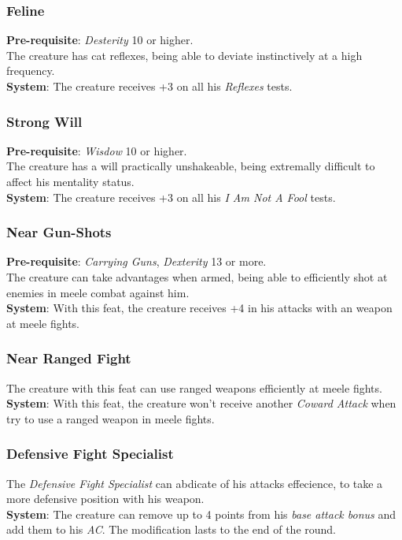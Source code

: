 \documentclass[ letterpaper,12pt]{article}
\begin{document}
\subsubsection{Feline}
{\bf Pre-requisite}: {\it Desterity} 10 or higher.\\
The creature has cat reflexes, being able to deviate instinctively at a high frequency.\\
{\bf System}: The creature receives +3 on all his {\it Reflexes} tests.

\subsubsection{Strong Will}
{\bf Pre-requisite}: {\it Wisdow} 10 or higher.\\
The creature has a will practically unshakeable, being extremally difficult to affect his mentality status.\\
{\bf System}: The creature receives +3 on all his {\it I Am Not A Fool} tests.

\subsubsection{Near Gun-Shots}
{\bf Pre-requisite}: {\it Carrying Guns}, {\it Dexterity} 13 or more.\\
The creature can take advantages when armed, being able to efficiently shot at enemies in meele combat against him.\\
{\bf System}: With this feat, the creature receives +4 in his attacks with an weapon at meele fights.

\subsubsection{Near Ranged Fight}
The creature with this feat can use ranged weapons efficiently at meele fights.\\
{\bf System}: With this feat, the creature won't receive another {\it Coward Attack} when try to use a ranged weapon in meele fights.

\subsubsection{Defensive Fight Specialist}
The {\it Defensive Fight Specialist} can abdicate of his attacks effecience, to take a more defensive position with his weapon.\\
{\bf System}: The creature can remove up to 4 points from his {\it base attack bonus} and add them to his {\it AC}. The modification lasts to the end of the round.
\end{document}
